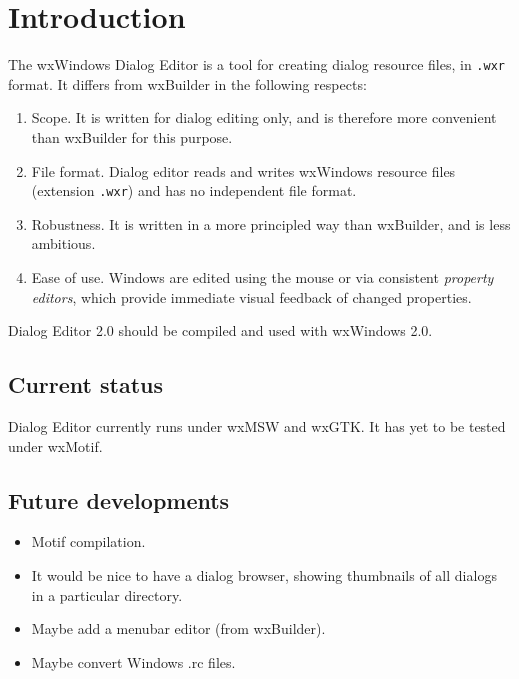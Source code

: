 \chapter{Introduction}\label{introduction}
%
%
\setfooter{\thepage}{}{}{}{}{\thepage}%

The wxWindows Dialog Editor is a tool for creating dialog resource files, in {\tt .wxr} format.
It differs from wxBuilder in the following respects:

\begin{enumerate}\itemsep=0pt
\item Scope. It is written for dialog editing only, and is therefore more convenient than wxBuilder for this purpose.
\item File format. Dialog editor reads and writes wxWindows resource files (extension {\tt .wxr}) and has
no independent file format.
\item Robustness. It is written in a more principled way than wxBuilder, and is less ambitious.
\item Ease of use. Windows are edited using the mouse or via consistent {\it property editors}, which
provide immediate visual feedback of changed properties.
\end{enumerate}

Dialog Editor 2.0 should be compiled and used with wxWindows 2.0.

\section{Current status}

Dialog Editor currently runs under wxMSW and wxGTK. It has yet to
be tested under wxMotif.

\section{Future developments}

\begin{itemize}\itemsep=0pt
\item Motif compilation.
\item It would be nice to have a dialog browser, showing thumbnails of
all dialogs in a particular directory.
\item Maybe add a menubar editor (from wxBuilder).
\item Maybe convert Windows .rc files.
\end{itemize}

